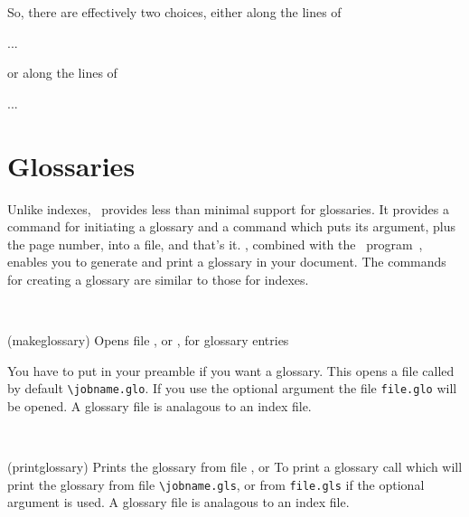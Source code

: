     So, there are effectively two choices, either along the lines of
\begin{lcode}
\renewcommand{\citeindexfile}{authors} %
\makeindex[\citeindexfile]
\usepackage{natbib}
\citeindextrue
...
\renewcommand{\indexname}{Index of citations}
\printindex[\citeindexfile]
\end{lcode}
or along the lines of
\begin{lcode}
\usepackage{natbib}
\citeindextrue
\makeindex
...
\printindex
\end{lcode}

\section{Glossaries}

    Unlike indexes, \ltx\ provides less than minimal support for 
glossaries. It provides a \cmd{\makeglossary} command for initiating a glossary
and a \cmd{\glossary} command which puts its argument, plus the page number,
into a  file, and that's it. \Mname, combined with the
\Lmakeindex\ program~\cite{CHEN88}, enables you to generate 
and print a glossary in 
your document. The commands for creating a glossary are similar to those
for indexes.

\begin{syntax}
\cmd{\makeglossary} \\
\end{syntax}
\glossary(makeglossary)%
  {}%
  {Opens file , or , for glossary entries}%

You have to put \cmd{\makeglossary} in your preamble if you want a glossary.
This opens a file called by default \verb?\jobname.glo?. If you use the 
optional  argument the file \verb?file.glo? will be opened.
A glossary  file is analagous to an index  file.

\begin{syntax}
\cmd{\printglossary} \\
\end{syntax}
\glossary(printglossary)%
  {}%
  {Prints the glossary from file , or }%
To print a glossary call \cmd{\printglossary} which will print the glossary
from file \verb?\jobname.gls?, or from \verb?file.gls? if the optional 
argument is used. A glossary  file is analagous to an
index  file.

